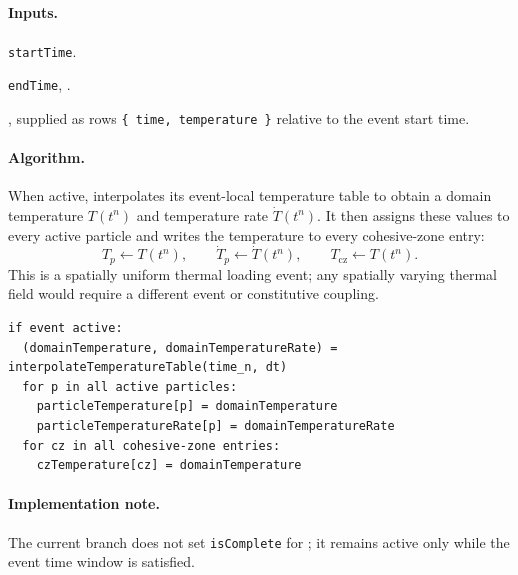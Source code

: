 \subsection{}
\label{subsec:event-temperature-profile}

\paragraph{Inputs.}
\begin{description}[leftmargin=*,style=nextline]
\item[\textbf{Required.}] \texttt{startTime}.
\item[\textbf{Optional.}] \texttt{endTime}, .
\item[\textbf{Required.}] , supplied as rows \texttt{\{ time, temperature \}} relative to the event start time.
\end{description}

\paragraph{Algorithm.}
When active,  interpolates its event-local temperature table to obtain a domain temperature $T(t^n)$ and temperature rate $\dot{T}(t^n)$.  It then assigns these values to every active particle and writes the temperature to every cohesive-zone entry:
\begin{equation}
  T_p\leftarrow T(t^n),
  \qquad
  \dot{T}_p\leftarrow \dot{T}(t^n),
  \qquad
  T_{\mathrm{cz}}\leftarrow T(t^n).
  \label{eq:temperature-profile-update}
\end{equation}
This is a spatially uniform thermal loading event; any spatially varying thermal field would require a different event or constitutive coupling.

\begin{lstlisting}[caption={TemperatureProfile event pseudocode.}]
if event active:
  (domainTemperature, domainTemperatureRate) = interpolateTemperatureTable(time_n, dt)
  for p in all active particles:
    particleTemperature[p] = domainTemperature
    particleTemperatureRate[p] = domainTemperatureRate
  for cz in all cohesive-zone entries:
    czTemperature[cz] = domainTemperature
\end{lstlisting}

\paragraph{Implementation note.}
The current branch does not set \texttt{isComplete} for ; it remains active only while the event time window is satisfied.

